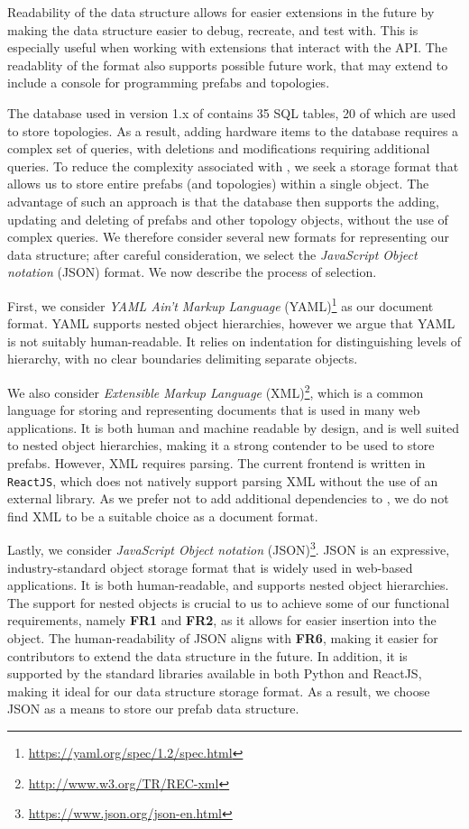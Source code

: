 \documentclass[11pt]{article}
\begin{document}
			Readability of the data structure allows for easier extensions in the future by making the data structure easier to debug, recreate, and test with.
			This is especially useful when working with extensions that interact with the API.
			The readablity of the format also supports possible future work, that may extend \opendc{} to include a console for programming prefabs and topologies.

			The database used in version 1.x of \opendc{} contains 35 SQL tables, 20 of which are used to store topologies.
			As a result, adding hardware items to the database requires a complex set of queries, with deletions and modifications requiring additional queries.
			To reduce the complexity associated with \opendc{}, we seek a storage format that allows us to store entire prefabs (and topologies) within a single object.
			The advantage of such an approach is that the database then supports the adding, updating and deleting of prefabs and other topology objects, without the use of complex queries.
			We therefore consider several new formats for representing our data structure; after careful consideration, we select the \textit{JavaScript Object notation} (JSON) format. We now describe the process of selection.

			First, we consider \textit{YAML Ain't Markup Language} (YAML)\footnote{\url{https://yaml.org/spec/1.2/spec.html}} as our document format.
			YAML supports nested object hierarchies, however we argue that YAML is not suitably human-readable.
			It relies on indentation for distinguishing levels of hierarchy, with no clear boundaries delimiting separate objects.

			We also consider \textit{Extensible Markup Language} (XML)\footnote{\url{http://www.w3.org/TR/REC-xml}}, which is a common language for storing and representing documents that is used in many web applications.
			It is both human and machine readable by design, and is well suited to nested object hierarchies, making it a strong contender to be used to store prefabs.
			However, XML requires parsing.
			The current \opendc{} frontend is written in \verb|ReactJS|, which does not natively support parsing XML without the use of an external library.
			As we prefer not to add additional dependencies to \opendc{}, we do not find XML to be a suitable choice as a document format.

			Lastly, we consider \textit{JavaScript Object notation} (JSON)\footnote{\url{https://www.json.org/json-en.html}}.
			JSON is an expressive, industry-standard object storage format that is widely used in web-based applications.
			It is both human-readable, and supports nested object hierarchies.
			The support for nested objects is crucial to us to achieve some of our functional requirements, namely \textbf{FR1} and \textbf{FR2}, as it allows for easier insertion into the object.
			The human-readability of JSON aligns with \textbf{FR6}, making it easier for contributors to extend the data structure in the future.
			In addition, it is supported by the standard libraries available in both Python and ReactJS, making it ideal for our data structure storage format.
			As a result, we choose JSON as a means to store our prefab data structure.
			
\end{document}
